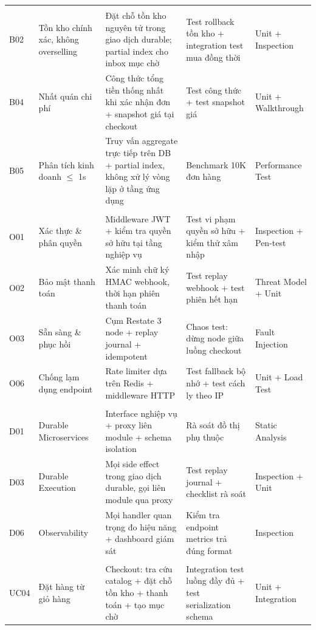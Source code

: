 \begin{longtable}{@{}L{1.3cm}L{3.5cm}L{4.2cm}L{3cm}L{2.3cm}@{}}
 \\
B02 & Tồn kho chính xác, không overselling & Đặt chỗ tồn kho nguyên tử trong giao dịch durable; partial index cho inbox mục chờ & Test rollback tồn kho + integration test mua đồng thời & Unit + Inspection \\
B04 & Nhất quán chi phí & Công thức tổng tiền thống nhất khi xác nhận đơn + snapshot giá tại checkout & Test công thức + test snapshot giá & Unit + Walkthrough \\
B05 & Phân tích kinh doanh $\leq$ 1s & Truy vấn aggregate trực tiếp trên DB + partial index, không xử lý vòng lặp ở tầng ứng dụng & Benchmark 10K đơn hàng & Performance Test \\
\addlinespace
{} \\
O01 & Xác thực \& phân quyền & Middleware JWT + kiểm tra quyền sở hữu tại tầng nghiệp vụ & Test vi phạm quyền sở hữu + kiểm thử xâm nhập & Inspection + Pen-test \\
O02 & Bảo mật thanh toán & Xác minh chữ ký HMAC webhook, thời hạn phiên thanh toán & Test replay webhook + test phiên hết hạn & Threat Model + Unit \\
O03 & Sẵn sàng \& phục hồi & Cụm Restate 3 node + replay journal + idempotent & Chaos test: dừng node giữa luồng checkout & Fault Injection \\
O06 & Chống lạm dụng endpoint & Rate limiter dựa trên Redis + middleware HTTP & Test fallback bộ nhớ + test cách ly theo IP & Unit + Load Test \\
\addlinespace
{} \\
D01 & Durable Microservices & Interface nghiệp vụ + proxy liên module + schema isolation & Rà soát đồ thị phụ thuộc & Static Analysis \\
D03 & Durable Execution & Mọi side effect trong giao dịch durable, gọi liên module qua proxy & Test replay journal + checklist rà soát & Inspection + Unit \\
D06 & Observability & Mọi handler quan trọng đo hiệu năng + dashboard giám sát & Kiểm tra endpoint metrics trả đúng format & Inspection \\
\addlinespace
{} \\
UC04 & Đặt hàng từ giỏ hàng & Checkout: tra cứu catalog + đặt chỗ tồn kho + thanh toán + tạo mục chờ & Integration test luồng đầy đủ + test serialization schema & Unit + Integration \\

\end{longtable}
